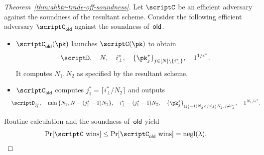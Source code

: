 \begin{proof}
[%
Theorem~\ref{thm:ahbtr-trade-off-soundness}]
Let $\scriptC$ be an efficient adversary against the soundness of the resultant scheme.
Consider the following efficient adversary $\scriptC_\OLD$ against the soundness of~$\OLD$.
\begin{itemize}
\item $\scriptC_\OLD(\pk)$ launches $\scriptC(\pk)$ to obtain
\begin{align*}
\scriptD,\quad
N,\quad
i^\ast_\bot,\quad
\{\pk^\ast_j\}_{j\in{[N]\setminus\{i^\ast_\bot\}}}^\sphantom,\quad
1^{1/\epsilon^\ast}.
\end{align*}
It computes $N_1,N_2$ as specified by the resultant scheme.
\item $\scriptC_\OLD$ computes ${j^\ast_1=\lceil i^\ast_\bot/N_2\rceil}$
and outputs
\begin{align*}
\WideNarrow{\hspace*{-1em}}{}
\scriptD_{j^\ast_1},\quad
&{}\min{\{N_2,N-(j^\ast_1-1)N_2\}},\quad
i^\ast_\bot-(j^\ast_1-1)N_2,
\WideNarrow{\quad}{\\&}
\{\pk^\ast_j\}_{(j^\ast_1-1)N_2^\sphantom<j\leq j^\ast_1N_2^\sphantom,\,j\neq i^\ast_\bot}^\sphantom,\quad
1^{N_1/\epsilon^\ast}.
\end{align*}
\end{itemize}
Routine calculation and the soundness of~$\OLD$ yield
\begin{align*}
\Pr[\scriptC\textup{ wins}]
&{}\leq
\Pr[\scriptC_\OLD\textup{ wins}]
=
\negl(\lambda).
\qedhere
\end{align*}
\end{proof}
